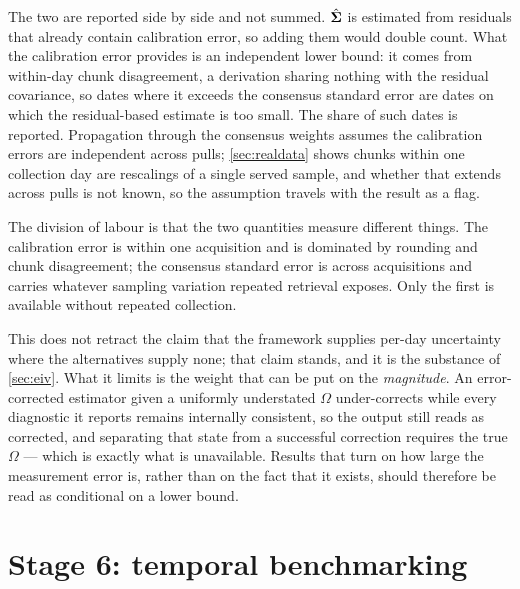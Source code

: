 \documentclass[12pt,a4paper,oneside]{article}
\begin{document}
The two are reported side by side and not summed. $\hat{\bm{\Sigma}}$ is estimated from
residuals that already contain calibration error, so adding them would double
count. What the calibration error provides is an independent lower bound: it comes
from within-day chunk disagreement, a derivation sharing nothing with the residual
covariance, so dates where it exceeds the consensus standard error are dates on
which the residual-based estimate is too small. The share of such dates is
reported. Propagation through the consensus weights assumes the calibration errors
are independent across pulls; \cref{sec:realdata} shows chunks within one
collection day are rescalings of a single served sample, and whether that extends
across pulls is not known, so the assumption travels with the result as a flag.

The division of labour is that the two quantities measure different things. The
calibration error is within one acquisition and is dominated by rounding and chunk
disagreement; the consensus standard error is across acquisitions and carries
whatever sampling variation repeated retrieval exposes. Only the first is available
without repeated collection.

This does not retract the claim that the framework supplies per-day uncertainty
where the alternatives supply none; that claim stands, and it is the substance of
\cref{sec:eiv}. What it limits is the weight that can be put on the
\emph{magnitude}. An error-corrected estimator given a uniformly understated
$\Omega$ under-corrects while every diagnostic it reports remains internally
consistent, so the output still reads as corrected, and separating that state
from a successful correction requires the true $\Omega$ --- which is exactly what
is unavailable. Results that turn on how large the measurement error is, rather
than on the fact that it exists, should therefore be read as conditional on a
lower bound.

\section{Stage 6: temporal benchmarking}\label{sec:benchmark}
\end{document}
